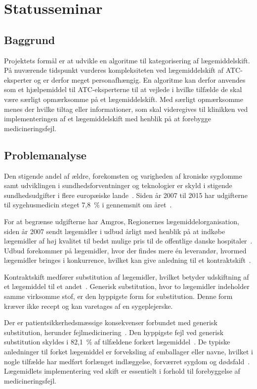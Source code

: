 \chapter{Statusseminar}
\section{Baggrund}
Projektets formål er at udvikle en algoritme til kategorisering af lægemiddelskift. På nuværende tidspunkt vurderes kompleksiteten ved lægemiddelskift af ATC-eksperter og er derfor meget personafhængig. En algoritme kan derfor anvendes som et hjælpemiddel til ATC-eksperterne til at vejlede i hvilke tilfælde de skal være særligt opmærksomme på et lægemiddelskift. Med særligt opmærksomme menes der hvilke tiltag eller informationer, som skal videregives til klinikken ved implementeringen af et lægemiddelskift med henblik på at forebygge medicineringsfejl. 

\section{Problemanalyse}
Den stigende andel af ældre, forekomsten og varigheden af kroniske sygdomme samt udviklingen i sundhedsforventninger og teknologier er skyld i stigende sundhedsudgifter i flere europæiske lande~\citep{Ess2003}. Siden år 2007 til 2015 har udgifterne til sygehusmedicin steget 7,8~\% i gennemsnit om året~\citep{Sundhed2016}.

For at begrænse udgifterne har Amgros, Regionernes lægemiddelorganisation, siden år 2007 sendt lægemidler i udbud årligt med henblik på at indkøbe lægemidler af høj kvalitet til bedst mulige pris til de offentlige danske hospitaler~\citep{Sygehusapoteket2017}. Udbud forekommer på lægemidler, hvor der findes mere én leverandør, hvormed lægemidler bringes i konkurrence, hvilket kan give anledning til et kontraktskift~\citep{Amgros2015}. 

Kontraktskift medfører substitution af lægemidler, hvilket betyder udskiftning af et lægemiddel til et andet~\citep{DanskSelskabforPatientsikkerhed2009}. 
Generisk substitution, hvor to lægemidler indeholder samme virksomme stof, er den hyppigste form for substitution. Denne form kræver ikke recept og kan varetages af en sygeplejerske.~\citep{DanskSelskabforPatientsikkerhed2009} 

Der er patientsikkerhedsmæssige konsekvenser forbundet med generisk substitution, herunder fejlmedicinering~\citep{Hakonsen2010}. 
Den hyppigste fejl ved generisk substitution skyldes i 82,1~\% af tilfældene forkert lægemiddel~\citep{Hakonsen2010}. De typiske anledninger til forket lægemiddel er forveksling af emballager eller navne, hvilket i nogle tilfælde har medført forlænget indlæggelse, forværret sygdom og dødsfald~\citep{DanskSelskabforPatientsikkerhed2009}. Lægemidlets implementering ved skift er essentielt i forhold til forebyggelse af medicineringsfejl.  

